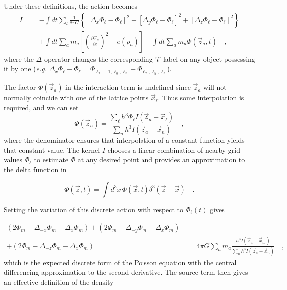 \documentclass{article}
\def\x{{\vec x}}
\def\z{{\vec z}}
\def\P{{\Phi}}
\def\l{{\ell}}
\def\Pl{{\Phi_{\ell}}}
\def\D{{\Delta}}
\def\.{{\quad .}}
\def\_,{{\quad ,}}
\begin{document}
Under these definitions, the action becomes
\begin{eqnarray}
I & = & - \int\!\! dt \sum_{l} \frac{1}{8 \pi G}
        \left\{
         \left[ \D_x \Pl - \Pl \right]^2 +
         \left[ \D_y \Pl - \Pl \right]^2 +
         \left[ \D_z \Pl - \Pl \right]^2
        \right\} \nonumber \\
  &   &
      + \int\!\! dt \sum_{a} m_a \left[ \left(\frac{\partial \z_a}
         {\partial t}\right)^2 - e(\rho_a) \right]
      - \int\!\! dt \sum_{a} m_a \Phi(\z_a,t) \_,
\end{eqnarray}
where the $\Delta$ operator changes the corresponding '$l$'-label on any object
possessing it by one ({\it e.g.} $\Delta_x \Pl - \Pl = \Phi_{\l_x+1,\l_y,\l_z} -
\Phi_{\l_x,\l_y,\l_z}$).

The factor $\Phi(\vec z_a)$ in the interaction term is undefined since
$\vec z_a$ will not normally coincide with one of the lattice points
$\vec x_\ell$.  Thus some interpolation is required, and we can set
\begin{equation}\label{eq:interpolate}
      \Phi(\z_a) = \frac{\sum_\l h^3 \Phi_\l I(\z_a - \x_\l)}
                  {\sum_n h^3 I(\z_a -\x_n)} \_,
\end{equation}
%
where the denominator ensures that interpolation of a constant function yields
that constant value.  The kernel $I$ chooses a linear combination of nearby
grid values $\Pl$ to estimate $\Phi$ at any desired point and provides an
approximation to the delta function in

\begin{equation}\label{eq:approxDelta}
    \Phi(\z,t) = \int\!\!d^3x\,\Phi(\x,t) \delta^3(\z-\x) \.
\end{equation}

Setting the variation of this discrete action with respect to $\Pl(t)$ gives

\begin{eqnarray}\label{eq:dis_Poi}
  \left( 2 \P_m - \D_{-x} \P_m - \D_x \P_m \right) +
  \left( 2 \P_m - \D_{-y} \P_m - \D_x \P_m \right) \nonumber & & \\
+ \left( 2 \P_m - \D_{-z} \P_m - \D_x \P_m \right) & = & 4 \pi G \sum_{a} m_a
  \frac{ h^3 I(\z_a - \x_m)}{\sum_n h^3 I(\z_a -\x_n)} \_,
\end{eqnarray}
%
which is the expected discrete form of the Poisson equation with the central
differencing approximation to the second derivative.  The source term then
gives an effective definition of the density
\end{document}
